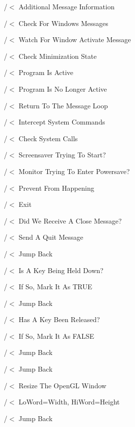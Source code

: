/$<$ Additional Message Information 

/$<$ Check For Windows Messages

/$<$ Watch For Window Activate Message

/$<$ Check Minimization State

/$<$ Program Is Active

/$<$ Program Is No Longer Active

/$<$ Return To The Message Loop

/$<$ Intercept System Commands

/$<$ Check System Calls

/$<$ Screensaver Trying To Start?

/$<$ Monitor Trying To Enter Powersave?

/$<$ Prevent From Happening

/$<$ Exit

/$<$ Did We Receive A Close Message?

/$<$ Send A Quit Message

/$<$ Jump Back

/$<$ Is A Key Being Held Down?

/$<$ If So, Mark It As T\+R\+UE

/$<$ Jump Back

/$<$ Has A Key Been Released?

/$<$ If So, Mark It As F\+A\+L\+SE

/$<$ Jump Back

/$<$ Jump Back

/$<$ Resize The Open\+GL Window

/$<$ Lo\+Word=Width, Hi\+Word=Height

/$<$ Jump Back

